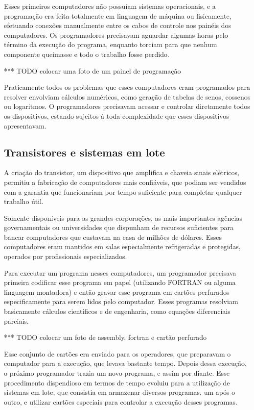 \documentclass[11pt,twoside,a4paper]{book}
\begin{document}
Esses primeiros computadores não possuíam sistemas operacionais, e a programação era feita totalmente em linguagem de máquina ou fisicamente, efetuando conexões manualmente entre os cabos de controle nos painéis dos computadores. Os programadores precisavam aguardar algumas horas pelo término da execução do programa, enquanto torciam para que nenhum componente queimasse e todo o trabalho fosse perdido. 

*** TODO colocar uma foto de um painel de programação

Praticamente todos os problemas que esses computadores eram programados para resolver envolviam cálculos numéricos, como geração de tabelas de senos, cossenos ou logaritmos. O programadores precisavam acessar e controlar diretamente todos os dispositivos, estando sujeitos à toda complexidade que esses dispositivos apresentavam. 

\subsection*{Transistores e sistemas em lote}
A criação do transistor, um dispositivo que amplifica e chaveia sinais elétricos, permitiu a fabricação de computadores mais confiáveis, que podiam ser vendidos com a garantia que funcionariam por tempo suficiente para completar qualquer trabalho útil.

Somente disponíveis para as grandes corporações, as mais importantes agências governamentais ou universidades que dispunham de recursos suficientes para bancar computadores que custavam na casa de milhões de dólares. Esses computadores eram mantidos em salas especialmente refrigeradas e protegidas, operados por profissionais especializados. 

Para executar um programa nesses computadores, um programador precisava primeira codificar esse programa em papel (utilizando FORTRAN ou alguma linguagem montadora) e então gravar esse programa em cartões perfurados especificamente para serem lidos pelo computador. Esses programas resolviam basicamente cálculos científicos e de engenharia, como equações diferenciais parciais.

*** TODO colocar um foto de assembly, fortran e cartão perfurado

Esse conjunto de cartões era enviado para os operadores, que preparavam o computador para a execução, que levava bastante tempo. Depois dessa execução, o próximo programador trazia um novo programa, e assim por diante. Esse procedimento dispendioso em termos de tempo evoluiu para a utilização de sistemas em lote, que consistia em armazenar diversos programas, um após o outro, e utilizar cartões especiais para controlar a execução desses programas.
\end{document}
